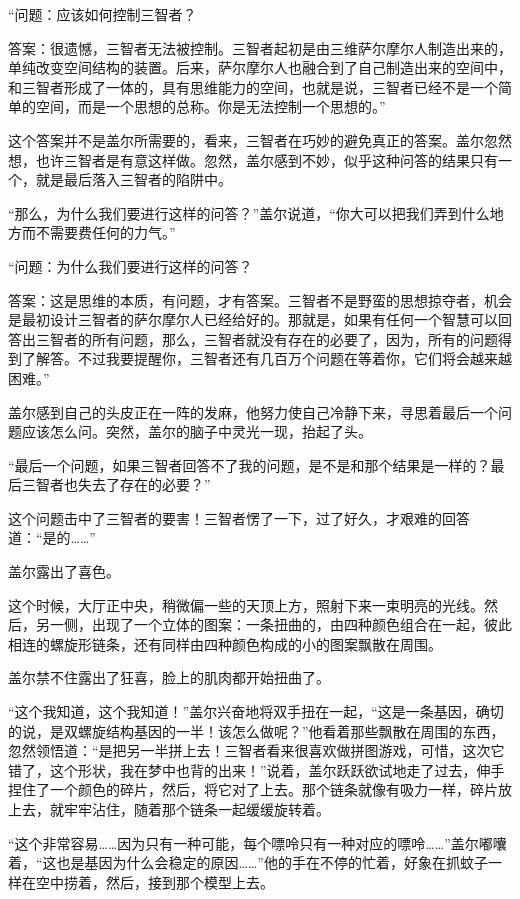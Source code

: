“问题：应该如何控制三智者？ 

答案：很遗憾，三智者无法被控制。三智者起初是由三维萨尔摩尔人制造出来的，单纯改变空间结构的装置。后来，萨尔摩尔人也融合到了自己制造出来的空间中，和三智者形成了一体的，具有思维能力的空间，也就是说，三智者已经不是一个简单的空间，而是一个思想的总称。你是无法控制一个思想的。” 

这个答案并不是盖尔所需要的，看来，三智者在巧妙的避免真正的答案。盖尔忽然想，也许三智者是有意这样做。忽然，盖尔感到不妙，似乎这种问答的结果只有一个，就是最后落入三智者的陷阱中。 

“那么，为什么我们要进行这样的问答？”盖尔说道，“你大可以把我们弄到什么地方而不需要费任何的力气。” 

“问题：为什么我们要进行这样的问答？ 

答案：这是思维的本质，有问题，才有答案。三智者不是野蛮的思想掠夺者，机会是最初设计三智者的萨尔摩尔人已经给好的。那就是，如果有任何一个智慧可以回答出三智者的所有问题，那么，三智者就没有存在的必要了，因为，所有的问题得到了解答。不过我要提醒你，三智者还有几百万个问题在等着你，它们将会越来越困难。” 

盖尔感到自己的头皮正在一阵的发麻，他努力使自己冷静下来，寻思着最后一个问题应该怎么问。突然，盖尔的脑子中灵光一现，抬起了头。 

“最后一个问题，如果三智者回答不了我的问题，是不是和那个结果是一样的？最后三智者也失去了存在的必要？” 

这个问题击中了三智者的要害！三智者愣了一下，过了好久，才艰难的回答道：“是的……” 

盖尔露出了喜色。 

这个时候，大厅正中央，稍微偏一些的天顶上方，照射下来一束明亮的光线。然后，另一侧，出现了一个立体的图案：一条扭曲的，由四种颜色组合在一起，彼此相连的螺旋形链条，还有同样由四种颜色构成的小的图案飘散在周围。 

盖尔禁不住露出了狂喜，脸上的肌肉都开始扭曲了。 

“这个我知道，这个我知道！”盖尔兴奋地将双手扭在一起，“这是一条基因，确切的说，是双螺旋结构基因的一半！该怎么做呢？”他看着那些飘散在周围的东西，忽然领悟道：“是把另一半拼上去！三智者看来很喜欢做拼图游戏，可惜，这次它错了，这个形状，我在梦中也背的出来！”说着，盖尔跃跃欲试地走了过去，伸手捏住了一个颜色的碎片，然后，将它对了上去。那个链条就像有吸力一样，碎片放上去，就牢牢沾住，随着那个链条一起缓缓旋转着。 

“这个非常容易……因为只有一种可能，每个嘌呤只有一种对应的嘌呤……”盖尔嘟囔着，“这也是基因为什么会稳定的原因……”他的手在不停的忙着，好象在抓蚊子一样在空中捞着，然后，接到那个模型上去。 

